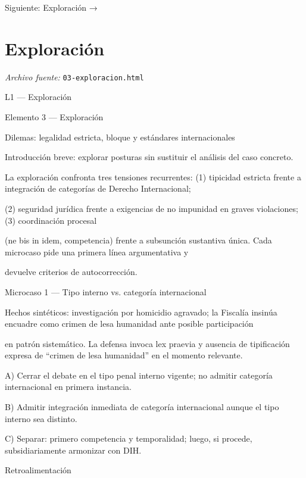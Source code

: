 \documentclass[11pt,a4paper]{article}
\begin{document}
    Siguiente: Exploración →\par

\section{Exploraci\'on}
\noindent\textit{Archivo fuente:} \texttt{03-exploracion.html}

L1 — Exploración\par





    Elemento 3 — Exploración\par
    Dilemas: legalidad estricta, bloque y estándares internacionales\par

    Introducción breve: explorar posturas sin sustituir el análisis del caso concreto.\par


      La exploración confronta tres tensiones recurrentes: (1) tipicidad estricta frente a integración de categorías de Derecho Internacional;\par
      (2) seguridad jurídica frente a exigencias de no impunidad en graves violaciones; (3) coordinación procesal\par
      (ne bis in idem, competencia) frente a subsunción sustantiva única. Cada microcaso pide una primera línea argumentativa y\par
      devuelve criterios de autocorrección.\par



      Microcaso 1 — Tipo interno vs. categoría internacional\par


        Hechos sintéticos: investigación por homicidio agravado; la Fiscalía insinúa encuadre como crimen de lesa humanidad ante posible participación\par
        en patrón sistemático. La defensa invoca lex praevia y ausencia de tipificación expresa de “crimen de lesa humanidad” en el momento relevante.\par


       A) Cerrar el debate en el tipo penal interno vigente; no admitir categoría internacional en primera instancia.\par
       B) Admitir integración inmediata de categoría internacional aunque el tipo interno sea distinto.\par
       C) Separar: primero competencia y temporalidad; luego, si procede, subsidiariamente armonizar con DIH.\par
      Retroalimentación\par
\end{document}
